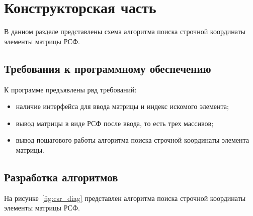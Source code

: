\chapter{Конструкторская часть}

В данном разделе представлены схема алгоритма поиска строчной координаты элементы матрицы РСФ.

\section{Требования к программному обеспечению}

К программе предъявлены ряд требований:

\begin{itemize}[label=---]
	\item наличие интерфейса для ввода матрицы и индекс искомого элемента;
	\item вывод матрицы в виде РСФ после ввода, то есть трех массивов;
	\item вывод пошагового работы алгоритма поиска строчной координаты элемента матрицы.
\end{itemize}

\section{Разработка алгоритмов}

На рисунке~\ref{fig:csr_diag} представлен алгоритма поиска строчной координаты элементы матрицы РСФ.

